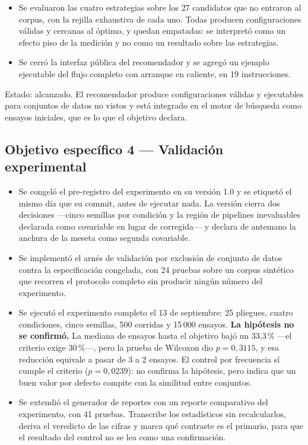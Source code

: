 \documentclass[11pt,letterpaper]{article}
\begin{document}
\begin{itemize}
        frecuencia no estaba en la hoja de ruta y se añadió porque es el que aísla la
        contribución del meta-aprendizaje.
  \item Se evaluaron las cuatro estrategias sobre los 27 candidatos que no entraron al
        corpus, con la rejilla exhaustiva de cada uno. Todas producen configuraciones
        válidas y cercanas al óptimo, y quedan empatadas: se interpretó como un efecto
        piso de la medición y no como un resultado sobre las estrategias.
  \item Se cerró la interfaz pública del recomendador y se agregó un ejemplo ejecutable
        del flujo completo con arranque en caliente, en 19 instrucciones.
\end{itemize}

Estado: alcanzado. El recomendador produce configuraciones válidas y ejecutables para
conjuntos de datos no vistos y está integrado en el motor de búsqueda como ensayos
iniciales, que es lo que el objetivo declara.

\subsection{Objetivo específico 4 --- Validación experimental}

\begin{itemize}
  \item Se congeló el pre-registro del experimento en su versión 1.0 y se etiquetó el
        mismo día que su commit, antes de ejecutar nada. La versión cierra dos
        decisiones ---cinco semillas por condición y la región de pipelines inevaluables
        declarada como covariable en lugar de corregida--- y declara de antemano la
        anchura de la meseta como segunda covariable.
  \item Se implementó el arnés de validación por exclusión de conjunto de datos contra la
        especificación congelada, con 24 pruebas sobre un corpus sintético que recorren
        el protocolo completo sin producir ningún número del experimento.
  \item Se ejecutó el experimento completo el 13 de septiembre: 25 pliegues, cuatro
        condiciones, cinco semillas, 500 corridas y 15\,000 ensayos.
        \textbf{La hipótesis no se confirmó.} La mediana de ensayos hasta el objetivo
        bajó un 33,3\,\% ---el criterio exige 30\,\%---, pero la prueba de Wilcoxon dio
        $p = 0{,}3115$, y esa reducción equivale a pasar de 3 a 2 ensayos. El control por
        frecuencia sí cumple el criterio ($p = 0{,}0239$): no confirma la hipótesis, pero
        indica que un buen valor por defecto compite con la similitud entre conjuntos.
  \item Se extendió el generador de reportes con un reporte comparativo del experimento,
        con 41 pruebas. Transcribe los estadísticos sin recalcularlos, deriva el
        veredicto de las cifras y marca qué contraste es el primario, para que el
        resultado del control no se lea como una confirmación.
\end{itemize}
\end{document}
